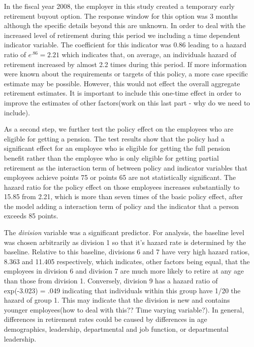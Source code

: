 \documentclass[12pt,letterpaper]{article}
\begin{document}
In the fiscal year 2008, the employer in this study created a temporary early retirement buyout option. The response window for this option was 3 months although the specific details beyond this are unknown. In order to deal with the increased level of retirement during this period we including a time dependent indicator variable.  The coefficient for this indicator was 0.86 leading to a hazard ratio of $e^{.86} = 2.21$ which indicates that, on average, an individuals hazard of retirement increased by almost 2.2 times during this period.  If more information were known about the requirements or targets of this policy, a more case specific estimate may be possible.  However, this would not effect the overall aggregate retirement estimates.  It is important to include this one-time effect in order to improve the estimates of other factors(work on this last part - why do we need to include). 

As a second step, we further test the policy effect on the employees who are eligible for getting a pension. The test results show that the policy had a significant effect for an employee who is eligible for getting the full pension benefit rather than the employee who is only eligible for getting partial retirement as the interaction term of between policy and indicator variables that employees achieve points 75 or points 65 are not statistically significant. The hazard ratio for the policy effect on those employees increases substantially to 15.85 from 2.21, which is more than seven times of the basic policy effect, after the model adding a interaction term of policy and the indicator that a person  exceeds 85 points.


The {\it division} variable was a significant predictor.  For analysis, the baseline level was chosen arbitrarily as division 1 so that it's hazard rate is determined by the baseline.  Relative to this baseline, divisions 6 and 7 have very high hazard ratios, 8.363 and 11.405 respectively, which indicates, other factors being equal, that the employees in division 6 and division 7 are much more likely to retire at any age than those from division 1.  Conversely, division 9 has a hazard ratio of exp(-3.023) = .049 indicating that individuals within this group have 1/20 the hazard of group 1.  This may indicate that the division is new and contains younger employees(how to deal with this??  Time varying variable?).  In general, differences in retirement rates could be caused by differences in age demographics, leadership, departmental and job function, or departmental leadership.
\end{document}
